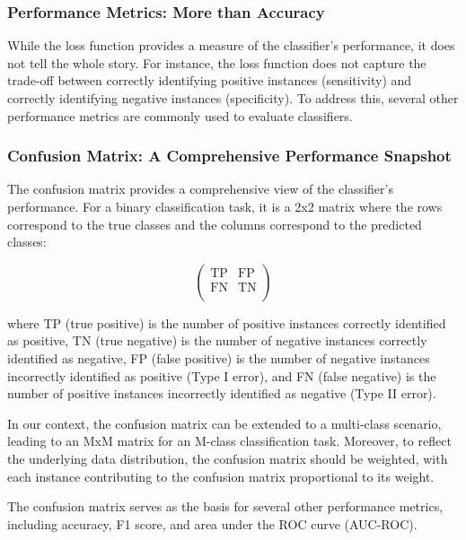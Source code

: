 \subsubsection{Performance Metrics: More than Accuracy}

While the loss function provides a measure of the classifier's performance, it does not tell the whole story. For
instance, the loss function does not capture the trade-off between correctly identifying positive instances
(sensitivity) and correctly identifying negative instances (specificity). To address this, several other performance
metrics are commonly used to evaluate classifiers.

\subsubsection{Confusion Matrix: A Comprehensive Performance Snapshot}

The confusion matrix provides a comprehensive view of the classifier's performance. For a binary classification task, it
is a 2x2 matrix where the rows correspond to the true classes and the columns correspond to the predicted classes:

\begin{equation}
    \begin{pmatrix}
        \text{TP} & \text{FP} \\
        \text{FN} & \text{TN} \\
    \end{pmatrix}
\end{equation}

where TP (true positive) is the number of positive instances correctly identified as positive, TN (true negative) is the
number of negative instances correctly identified as negative, FP (false positive) is the number of negative instances
incorrectly identified as positive (Type I error), and FN (false negative) is the number of positive instances
incorrectly identified as negative (Type II error).

In our context, the confusion matrix can be extended to a multi-class scenario, leading to an MxM matrix for an M-class
classification task. Moreover, to reflect the underlying data distribution, the confusion matrix should be weighted,
with each instance contributing to the confusion matrix proportional to its weight.

The confusion matrix serves as the basis for several other performance metrics, including accuracy, F1 score, and area
under the ROC curve (AUC-ROC).

